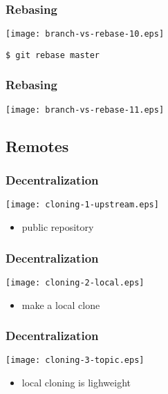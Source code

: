 \documentclass[english]{beamer}
\newcommand{\mysubsection}[2]{%
  \hypertarget{#2}{}%
  \subsection{#1}%
  \label{#2}%
}
\newcommand{\CMD}[1]{%
\texttt{\textcolor{code-blue}{#1}}%
}
\begin{document}
\begin{frame}
\frametitle{Rebasing}

\texttt{[image: branch-vs-rebase-10.eps]}
\vspace{\baselineskip}
\begin{flushright}
        \CMD{\$ git rebase master}
\end{flushright}
\vspace{\textheight}
\end{frame}

\begin{frame}
\frametitle{Rebasing}

\texttt{[image: branch-vs-rebase-11.eps]}
\vspace{\textheight}
\end{frame}

\mysubsection{Remotes}{using:remotes}

\begin{frame}
\frametitle{Decentralization}
\texttt{[image: cloning-1-upstream.eps]}
\begin{itemize}
        \item public repository
\end{itemize}
\end{frame}

\begin{frame}
\frametitle{Decentralization}
\texttt{[image: cloning-2-local.eps]}
\begin{itemize}
        \item make a local clone
\end{itemize}
\end{frame}

\begin{frame}
\frametitle{Decentralization}
\texttt{[image: cloning-3-topic.eps]}
\begin{itemize}
        \item local cloning is lighweight
\end{itemize}
\end{frame}
\end{document}
